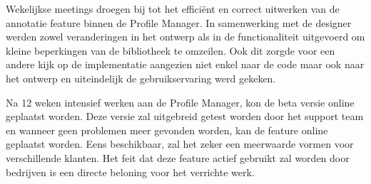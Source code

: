 Wekelijkse meetings droegen bij tot het effici\"{e}nt en correct uitwerken van de annotatie feature binnen de Profile Manager. In samenwerking met de designer werden zowel veranderingen in het ontwerp als in de functionaliteit uitgevoerd om kleine beperkingen van de bibliotheek te omzeilen. Ook dit zorgde voor een andere kijk op de implementatie aangezien niet enkel naar de code maar ook naar het ontwerp en uiteindelijk de gebruikservaring werd gekeken. 

Na 12 weken intensief werken aan de Profile Manager, kon de beta versie online geplaatst worden. Deze versie zal uitgebreid getest worden door het support team en wanneer geen problemen meer gevonden worden, kan de feature online geplaatst worden. Eens beschikbaar, zal het zeker een meerwaarde vormen voor verschillende klanten. Het feit dat deze feature actief gebruikt zal worden door bedrijven is een directe beloning voor het verrichte werk.  

















